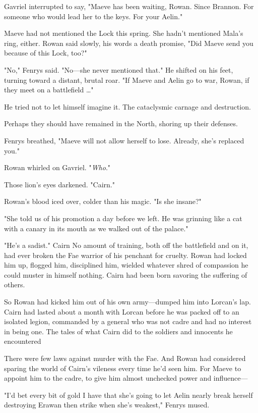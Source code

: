 Gavriel interrupted to say, "Maeve has been waiting, Rowan. Since Brannon. For someone who would lead her to the keys. For your Aelin."

Maeve had not mentioned the Lock this spring. She hadn't mentioned Mala's ring, either. Rowan said slowly, his words a death promise, "Did Maeve send you because of this Lock, too?"

"No," Fenrys said. "No---she never mentioned that." He shifted on his feet, turning toward a distant, brutal roar. "If Maeve and Aelin go to war, Rowan, if they meet on a battlefield \ldots"

He tried not to let himself imagine it. The cataclysmic carnage and destruction.

Perhaps they should have remained in the North, shoring up their defenses.

Fenrys breathed, "Maeve will not allow herself to lose. Already, she's replaced you."

Rowan whirled on Gavriel. "\emph{Who}."

Those lion's eyes darkened. "Cairn."

Rowan's blood iced over, colder than his magic. "Is she insane?"

"She told us of his promotion a day before we left. He was grinning like a cat with a canary in its mouth as we walked out of the palace."

"He's a sadist." Cairn  No amount of training, both off the battlefield and on it, had ever broken the Fae warrior of his penchant for cruelty. Rowan had locked him up, flogged him, disciplined him, wielded whatever shred of compassion he could muster in himself 
nothing. Cairn had been born savoring the suffering of others.

So Rowan had kicked him out of his own army---dumped him into Lorcan's lap. Cairn had lasted about a month with Lorcan before he was packed off to an isolated legion, commanded by a general who was not cadre and had no interest in being one. The tales of what Cairn did to the soldiers and innocents he encountered 

There were few laws against murder with the Fae. And Rowan had considered sparing the world of Cairn's vileness every time he'd seen him. For Maeve to appoint him to the cadre, to give him almost unchecked power and influence---

"I'd bet every bit of gold I have that she's going to let Aelin nearly break herself destroying Erawan  then strike when she's weakest," Fenrys mused.

